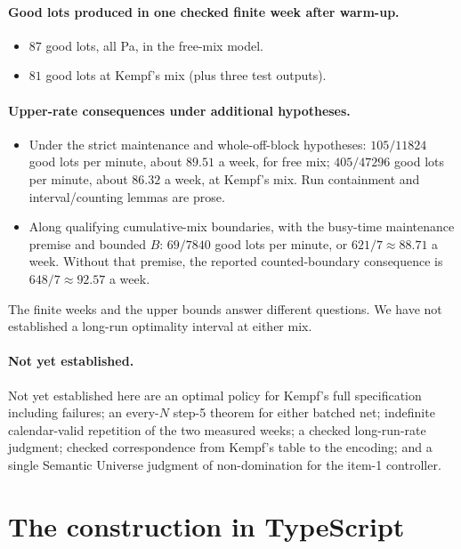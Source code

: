 \paragraph{Good lots produced in one checked finite week after warm-up.}
\begin{itemize}
\item $87$ good lots, all Pa, in the free-mix model.
\item $81$ good lots at Kempf's mix (plus three test outputs).
\end{itemize}

\paragraph{Upper-rate consequences under additional hypotheses.}
\begin{itemize}
\item Under the strict maintenance and whole-off-block hypotheses:
  $105/11824$ good lots per minute, about $89.51$ a week, for free
  mix; $405/47296$ good lots per minute, about $86.32$ a week, at
  Kempf's mix. Run containment and interval/counting lemmas are prose.
\item Along qualifying cumulative-mix boundaries, with the busy-time
  maintenance premise and bounded $B$: $69/7840$ good lots per minute,
  or $621/7\approx 88.71$ a week. Without that premise, the reported
  counted-boundary consequence is $648/7\approx 92.57$ a week.
\end{itemize}

The finite weeks and the upper bounds answer different questions. We
have not established a long-run optimality interval at either mix.

\paragraph{Not yet established.}
Not yet established here are an optimal policy for Kempf's full
specification including failures; an every-$N$ step-5 theorem for either
batched net; indefinite calendar-valid repetition of the two measured
weeks; a checked long-run-rate judgment; checked correspondence from
Kempf's table to the encoding; and a single Semantic Universe judgment
of non-domination for the item-1 controller.

\section{The construction in TypeScript}
\label{sec:minifab-ts}

